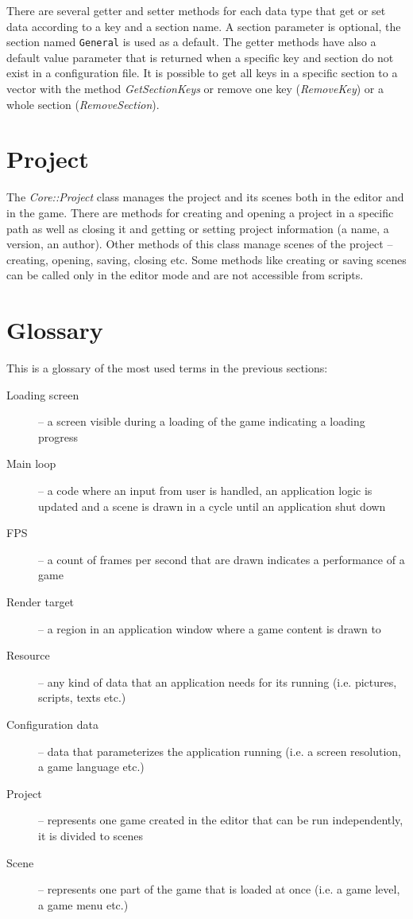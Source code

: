 \documentclass[a4paper, 12pt]{report}
\begin{document}
There are several getter and setter methods for each data type that get or set data according to a key and a section name. A section parameter is optional, the section named \verb|General| is used as a default. The getter methods have also a default value parameter that is returned when a specific key and section do not exist in a configuration file. It is possible to get all keys in a specific section to a vector with the method \emph{GetSectionKeys} or remove one key (\emph{RemoveKey}) or a whole section (\emph{RemoveSection}).

\section{Project}

The \emph{Core::Project} class manages the project and its scenes both in the editor and in the game. There are methods for creating and opening a project in a specific path as well as closing it and getting or setting project information (a name, a version, an author). Other methods of this class manage scenes of the project -- creating, opening, saving, closing etc. Some methods like creating or saving scenes can be called only in the editor mode and are not accessible from scripts.

\section{Glossary}
This is a glossary of the most used terms in the previous sections:

\begin{description}
  \item[Loading screen] -- a screen visible during a loading of the game indicating a loading progress
  \item[Main loop] -- a code where an input from user is handled, an application logic is updated and a scene is drawn in a cycle until an application shut down
  \item[FPS] -- a count of frames per second that are drawn indicates a performance of a game
  \item[Render target] -- a region in an application window where a game content is drawn to
  \item[Resource] -- any kind of data that an application needs for its running (i.e. pictures, scripts, texts etc.)
  \item[Configuration data] -- data that parameterizes the application running (i.e. a screen resolution, a game language etc.)
  \item[Project] -- represents one game created in the editor that can be run independently, it is divided to scenes
  \item[Scene] -- represents one part of the game that is loaded at once (i.e. a game level, a game menu etc.)
\end{description}
\end{document}
